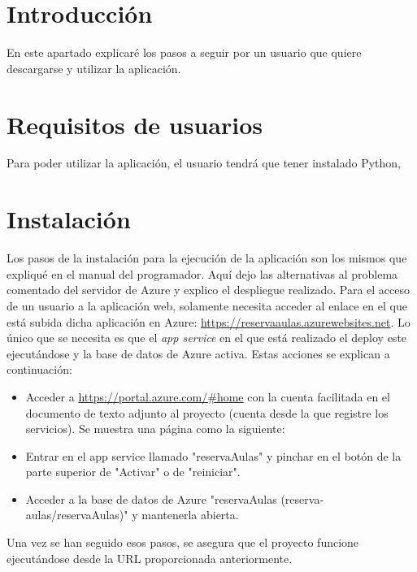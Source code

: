 
\section{Introducción}
En este apartado explicaré los pasos a seguir por un usuario que quiere descargarse y utilizar la aplicación.
\section{Requisitos de usuarios}
Para poder utilizar la aplicación, el usuario tendrá que tener instalado Python, 
\section{Instalación}
Los pasos de la instalación para la ejecución de la aplicación son los mismos que expliqué en el manual del programador. Aquí dejo las alternativas al problema comentado del servidor de Azure y explico el despliegue realizado.\newline
Para el acceso de un usuario a la aplicación web, solamente necesita acceder al enlace en el que está subida dicha aplicación en Azure:\newline
\url{https://reservaaulas.azurewebsites.net}.
\newline
Lo único que se necesita es que el \textit{app service} en el que está realizado el deploy este ejecutándose y la base de datos de Azure activa. Estas acciones se explican a continuación:\newline
\begin{itemize}
    \item Acceder a \url{https://portal.azure.com/#home} con la cuenta facilitada en el documento de texto adjunto al proyecto (cuenta desde la que registre los servicios). Se muestra una página como la siguiente:\newline
    \item Entrar en el app service llamado "reservaAulas" y pinchar en el botón de la parte superior de "Activar" o de "reiniciar".\newline
    \item Acceder a la base de datos de Azure "reservaAulas (reserva-aulas/reservaAulas)" y mantenerla abierta.
\end{itemize}
Una vez se han seguido esos pasos, se asegura que el proyecto funcione ejecutándose desde la URL proporcionada anteriormente.
